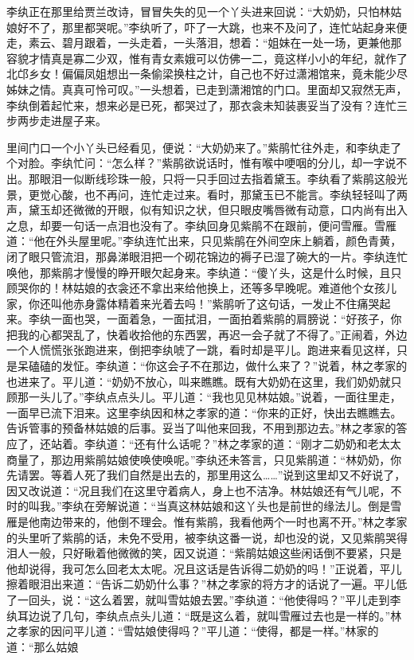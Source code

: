 \begin{parag}
    李纨正在那里给贾兰改诗，冒冒失失的见一个丫头进来回说：“大奶奶，只怕林姑娘好不了，那里都哭呢。”李纨听了，吓了一大跳，也来不及问了，连忙站起身来便走，素云、碧月跟着，一头走着，一头落泪，想着：“姐妹在一处一场，更兼他那容貌才情真是寡二少双，惟有青女素娥可以仿佛一二，竟这样小小的年纪，就作了北邙乡女！偏偏凤姐想出一条偷梁换柱之计，自己也不好过潇湘馆来，竟未能少尽姊妹之情。真真可怜可叹。”一头想着，已走到潇湘馆的门口。里面却又寂然无声，李纨倒着起忙来，想来必是已死，都哭过了，那衣衾未知装裹妥当了没有？连忙三步两步走进屋子来。
\end{parag}


\begin{parag}
    里间门口一个小丫头已经看见，便说：“大奶奶来了。”紫鹃忙往外走，和李纨走了个对脸。李纨忙问：“怎么样？”紫鹃欲说话时，惟有喉中哽咽的分儿，却一字说不出。那眼泪一似断线珍珠一般，只将一只手回过去指着黛玉。李纨看了紫鹃这般光景，更觉心酸，也不再问，连忙走过来。看时，那黛玉已不能言。李纨轻轻叫了两声，黛玉却还微微的开眼，似有知识之状，但只眼皮嘴唇微有动意，口内尚有出入之息，却要一句话一点泪也没有了。李纨回身见紫鹃不在跟前，便问雪雁。雪雁道：“他在外头屋里呢。”李纨连忙出来，只见紫鹃在外间空床上躺着，颜色青黄，闭了眼只管流泪，那鼻涕眼泪把一个砌花锦边的褥子已湿了碗大的一片。李纨连忙唤他，那紫鹃才慢慢的睁开眼欠起身来。李纨道：“傻丫头，这是什么时候，且只顾哭你的！林姑娘的衣衾还不拿出来给他换上，还等多早晚呢。难道他个女孩儿家，你还叫他赤身露体精着来光着去吗！”紫鹃听了这句话，一发止不住痛哭起来。李纨一面也哭，一面着急，一面拭泪，一面拍着紫鹃的肩膀说：“好孩子，你把我的心都哭乱了，快着收拾他的东西罢，再迟一会子就了不得了。”正闹着，外边一个人慌慌张张跑进来，倒把李纨唬了一跳，看时却是平儿。跑进来看见这样，只是呆磕磕的发怔。李纨道：“你这会子不在那边，做什么来了？”说着，林之孝家的也进来了。平儿道：“奶奶不放心，叫来瞧瞧。既有大奶奶在这里，我们奶奶就只顾那一头儿了。”李纨点点头儿。平儿道：“我也见见林姑娘。”说着，一面往里走，一面早已流下泪来。这里李纨因和林之孝家的道：“你来的正好，快出去瞧瞧去。告诉管事的预备林姑娘的后事。妥当了叫他来回我，不用到那边去。”林之孝家的答应了，还站着。李纨道：“还有什么话呢？”林之孝家的道：“刚才二奶奶和老太太商量了，那边用紫鹃姑娘使唤使唤呢。”李纨还未答言，只见紫鹃道：“林奶奶，你先请罢。等着人死了我们自然是出去的，那里用这么……”说到这里却又不好说了，因又改说道：“况且我们在这里守着病人，身上也不洁净。林姑娘还有气儿呢，不时的叫我。”李纨在旁解说道：“当真这林姑娘和这丫头也是前世的缘法儿。倒是雪雁是他南边带来的，他倒不理会。惟有紫鹃，我看他两个一时也离不开。”林之孝家的头里听了紫鹃的话，未免不受用，被李纨这番一说，却也没的说，又见紫鹃哭得泪人一般，只好瞅着他微微的笑，因又说道：“紫鹃姑娘这些闲话倒不要紧，只是他却说得，我可怎么回老太太呢。况且这话是告诉得二奶奶的吗！”正说着，平儿擦着眼泪出来道：“告诉二奶奶什么事？”林之孝家的将方才的话说了一遍。平儿低了一回头，说：“这么着罢，就叫雪姑娘去罢。”李纨道：“他使得吗？”平儿走到李纨耳边说了几句，李纨点点头儿道：“既是这么着，就叫雪雁过去也是一样的。”林之孝家的因问平儿道：“雪姑娘使得吗？”平儿道：“使得，都是一样。”林家的道：“那么姑娘
\end{parag}
